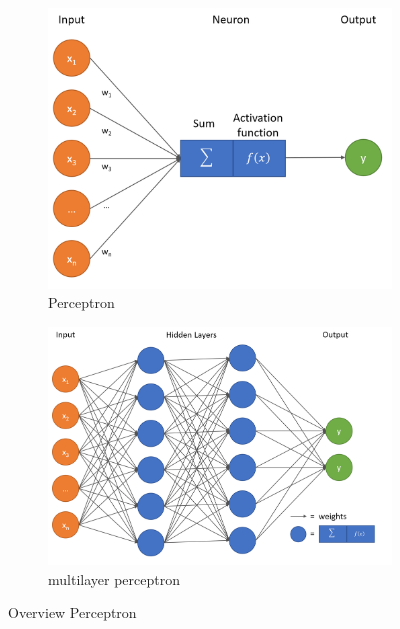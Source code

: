 \begin{figure}
    \begin{subfigure}{0.8\textwidth}
      \includegraphics[width=\linewidth]{images/perceptron.png}
      \caption[Perceptron]{Perceptron} \label{fig:perceptron}
    \end{subfigure}%
    \hspace*{\fill}   %
    \begin{subfigure}{0.8\textwidth}
      \includegraphics[width=\linewidth]{images/mlp.png}
      \caption[Multilayer Perceptron]{multilayer perceptron} \label{fig:mlp}
    \end{subfigure}%
    \hspace*{\fill}   %
  \caption[Overview Perceptron]{Overview Perceptron} \label{fig:NN_Overview}
\end{figure}

